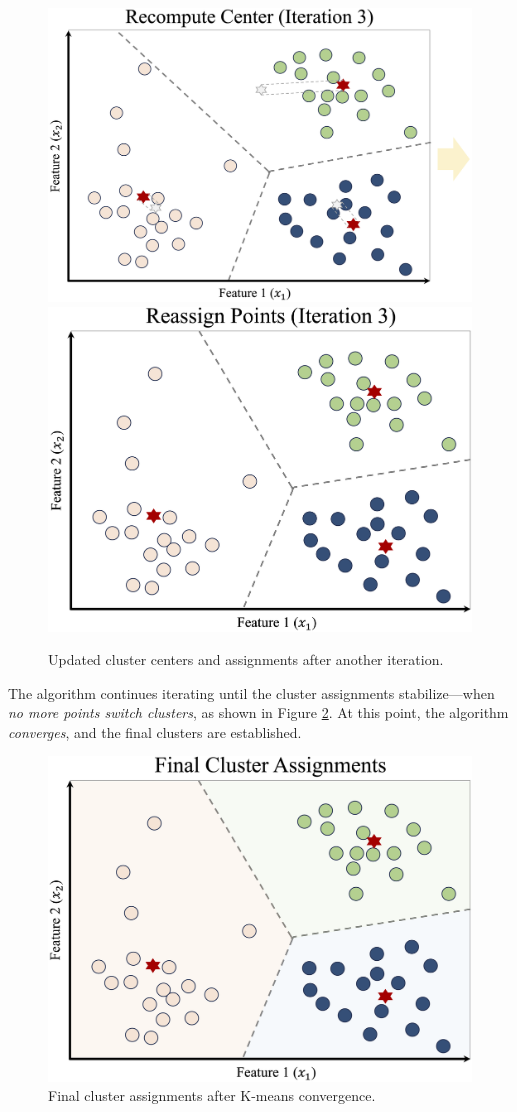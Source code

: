 \documentclass[
  11pt,
]{book}
\theoremstyle{definition}
\theoremstyle{definition}
\theoremstyle{definition}
\theoremstyle{definition}
\theoremstyle{remark}
\begin{document}
\begin{figure}[H]

{\centering \includegraphics[width=0.45\linewidth]{images/ch13_cluster_ex_6} \includegraphics[width=0.45\linewidth]{images/ch13_cluster_ex_7} 

}

\caption{Updated cluster centers and assignments after another iteration.}\label{fig:cluster-ex-6}
\end{figure}

The algorithm continues iterating until the cluster assignments stabilize---when \emph{no more points switch clusters}, as shown in Figure \ref{fig:cluster-ex-8}. At this point, the algorithm \emph{converges}, and the final clusters are established.

\begin{figure}[H]

{\centering \includegraphics[width=0.45\linewidth]{images/ch13_cluster_ex_8} 

}

\caption{Final cluster assignments after K-means convergence.}\label{fig:cluster-ex-8}
\end{figure}
\end{document}
